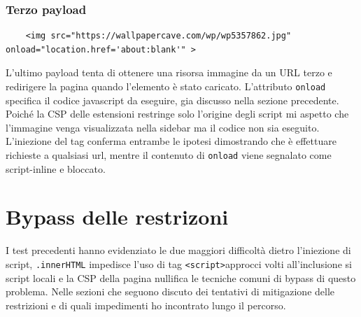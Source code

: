 \documentclass{sapthesis}
\newcommand{\code}[1]{\texttt{#1}}
\newcommand{\attr}[1]{\code{.#1}}
\newcommand{\tagHTML}[1]{\code{<#1>}}
\newcommand{\script}{\tagHTML{script}}
\begin{document}
        \subsubsection{Terzo payload}
            \begin{lstlisting}
    <img src="https://wallpapercave.com/wp/wp5357862.jpg" onload="location.href='about:blank'" >
            \end{lstlisting}
            L'ultimo payload tenta di ottenere una risorsa immagine da un URL terzo e redirigere la pagina
            quando l'elemento è stato caricato. L'attributo \code{onload} specifica il codice javascript
            da eseguire, gia discusso nella sezione precedente. Poiché la CSP delle estensioni restringe 
            solo l'origine degli script mi aspetto che l'immagine venga visualizzata nella sidebar ma il
            codice non sia eseguito. L'iniezione del tag conferma entrambe le ipotesi dimostrando che
            è effettuare richieste a qualsiasi url, mentre il contenuto di \code{onload} viene segnalato
            come script-inline e bloccato.\\

    \section{Bypass delle restrizoni}
    \label{sec:attaccando-vuln-bypass}
        I test precedenti hanno evidenziato le due maggiori difficoltà dietro l'iniezione di script,
        \attr{innerHTML} impedisce l'uso di tag \script approcci volti all'inclusione si script locali
        e la CSP della pagina nullifica le tecniche comuni di bypass di questo problema. Nelle sezioni
        che seguono discuto dei tentativi di mitigazione delle restrizioni e di quali impedimenti ho
        incontrato lungo il percorso.
        
\end{document}
